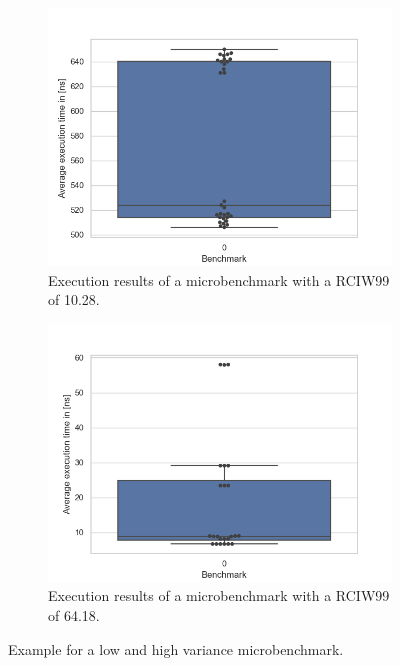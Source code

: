 \documentclass{seal_thesis}
\begin{document}
\begin{figure}[H]
	\centering
	\begin{subfigure}{.5\textwidth}
		\centering
		\includegraphics[width=\linewidth]{10percentvariance}
		\caption{Execution results of a microbenchmark with a RCIW99 of 10.28.}
		\label{fig:10percentvariance}
	\end{subfigure}%
	\begin{subfigure}{.5\textwidth}
		\centering
		\includegraphics[width=\linewidth]{60percentvariance}
		\caption{Execution results of a microbenchmark with a RCIW99 of 64.18.}
		\label{fig:60percentvariance}
	\end{subfigure}
	\caption{Example for a low and high variance microbenchmark.}
	\label{fig:variances}
\end{figure}
\end{document}
